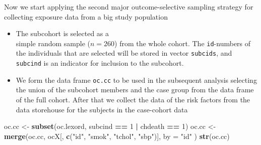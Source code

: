 \documentclass[
]{book}
\newenvironment{Shaded}{\begin{snugshade}}{\end{snugshade}}
\newcommand{\AttributeTok}[1]{\textcolor[rgb]{0.13,0.29,0.53}{#1}}
\newcommand{\DecValTok}[1]{\textcolor[rgb]{0.00,0.00,0.81}{#1}}
\newcommand{\FunctionTok}[1]{\textcolor[rgb]{0.13,0.29,0.53}{\textbf{#1}}}
\newcommand{\NormalTok}[1]{#1}
\newcommand{\OtherTok}[1]{\textcolor[rgb]{0.56,0.35,0.01}{#1}}
\newcommand{\SpecialCharTok}[1]{\textcolor[rgb]{0.81,0.36,0.00}{\textbf{#1}}}
\newcommand{\StringTok}[1]{\textcolor[rgb]{0.31,0.60,0.02}{#1}}
\providecommand{\tightlist}{%
  \setlength{\itemsep}{0pt}\setlength{\parskip}{0pt}}
\begin{document}
Now we start applying the second major outcome-selective
sampling strategy
for collecting exposure data from a big study population

\begin{itemize}
\tightlist
\item
  The subcohort is selected as a\\
  simple random sample (\(n=260\)) from the whole cohort.
  The \texttt{id}-numbers of the individuals that are
  selected will be stored in vector \texttt{subcids}, and
  \texttt{subcind} is an indicator for inclusion to the subcohort.
\end{itemize}

\begin{Shaded}
\end{Shaded}

\begin{itemize}
\tightlist
\item
  We form the data frame \texttt{oc.cc}
  to be used in the subsequent
  analysis selecting the union of the subcohort members
  and the case group from the data frame of the full cohort.
  After that we collect the data of the risk factors from the
  data storehouse for the subjects in the case-cohort data
\end{itemize}

\begin{Shaded}
\begin{Highlighting}[]
\NormalTok{oc.cc }\OtherTok{\textless{}{-}} \FunctionTok{subset}\NormalTok{(oc.lexord, subcind }\SpecialCharTok{==} \DecValTok{1} \SpecialCharTok{|}\NormalTok{ chdeath }\SpecialCharTok{==} \DecValTok{1}\NormalTok{)}
\NormalTok{oc.cc }\OtherTok{\textless{}{-}} \FunctionTok{merge}\NormalTok{(oc.cc, ocX[, }\FunctionTok{c}\NormalTok{(}\StringTok{"id"}\NormalTok{, }\StringTok{"smok"}\NormalTok{, }\StringTok{"tchol"}\NormalTok{, }\StringTok{"sbp"}\NormalTok{)],}
  \AttributeTok{by =} \StringTok{"id"}
\NormalTok{)}
\FunctionTok{str}\NormalTok{(oc.cc)}
\end{Highlighting}
\end{Shaded}
\end{document}
